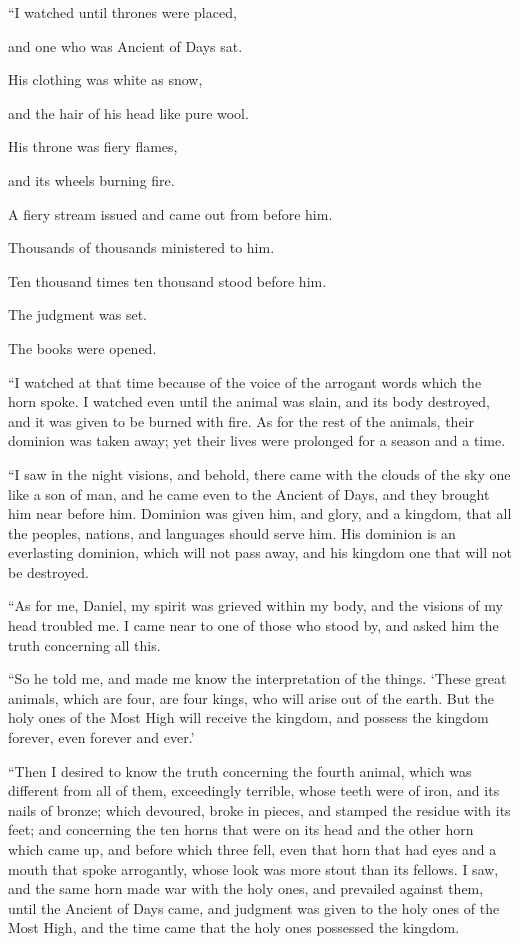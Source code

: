 \myverse{}“I watched until thrones were placed,

and one who was Ancient of Days sat.

His clothing was white as snow,

and the hair of his head like pure wool.

His throne was fiery flames,

and its wheels burning fire.

\myverse{}A fiery stream issued and came out from before him.

Thousands of thousands ministered to him.

Ten thousand times ten thousand stood before him.

The judgment was set.

The books were opened.

\myverse{}“I watched at that time because of the voice of the arrogant
words which the horn spoke. I watched even until the animal was slain, and its body destroyed, and it
was given to be burned with fire.
\myverse{}As for the rest of the animals, their dominion was taken away; yet their lives
were prolonged for a season and a time.

\myverse{}“I saw in the night visions, and behold, there came with the
clouds of the sky one like a son of man, and he came even to the Ancient of Days, and they brought him
near before him.
\myverse{}Dominion was given him, and glory, and a kingdom, that all the peoples, nations,
and languages should serve him. His dominion is an everlasting dominion, which will not pass away, and
his kingdom one that will not be destroyed.

\myverse{}“As for me, Daniel, my spirit was grieved within my body, and
the visions of my head troubled me.
\myverse{}I came near to one of those who stood by, and asked him the truth concerning
all this.

“So he told me, and made me know the interpretation of the things.
\myverse{}‘These great animals, which are four, are four kings, who will arise out of
the earth.
\myverse{}But the holy ones of the Most High will receive the kingdom, and possess the
kingdom forever, even forever and ever.’

\myverse{}“Then I desired to know the truth concerning the fourth animal,
which was different from all of them, exceedingly terrible, whose teeth were of iron, and its nails of
bronze; which devoured, broke in pieces, and stamped the residue with its feet;
\myverse{}and concerning the ten horns that were on its head and the other horn which
came up, and before which three fell, even that horn that had eyes and a mouth that spoke arrogantly,
whose look was more stout than its fellows.
\myverse{}I saw, and the same horn made war with the holy ones, and prevailed against
them,
\myverse{}until the Ancient of Days came, and judgment was given to the holy ones of
the Most High, and the time came that the holy ones possessed the kingdom.

